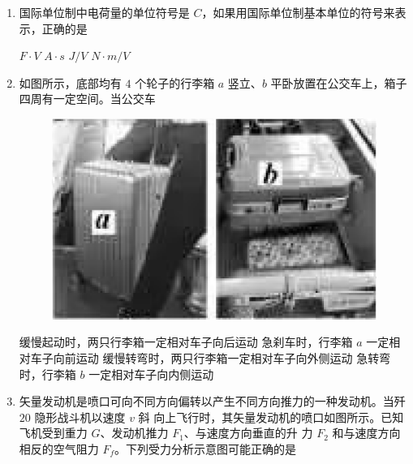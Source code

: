 
\gaokaoxz

\begin{enumerate}
\item
国际单位制中电荷量的单位符号是 $ C $，如果用国际单位制基本单位的符号来表示，正确的是  

\fourchoices
{$ F \cdot V $}
{$ A \cdot s $}
{$ J/V $}
{$ N \cdot m/V $}


\item
如图所示，底部均有 $ 4 $ 个轮子的行李箱 $ a $ 竖立、$ b $ 平卧放置在公交车上，箱子四周有一定空间。当公交车  
\begin{figure}[h!]
\centering
\includegraphics[width=0.23\linewidth]{picture/screenshot041}
\end{figure}

\fourchoices
{缓慢起动时，两只行李箱一定相对车子向后运动}
{急刹车时，行李箱 $ a $ 一定相对车子向前运动}
{缓慢转弯时，两只行李箱一定相对车子向外侧运动}
{急转弯时，行李箱 $ b $ 一定相对车子向内侧运动}


\item
矢量发动机是喷口可向不同方向偏转以产生不同方向推力的一种发动机。当歼 $ 20 $ 隐形战斗机以速度 $ v $ 斜
向上飞行时，其矢量发动机的喷口如图所示。已知飞机受到重力 $ G $、发动机推力 $ F_{1} $、与速度方向垂直的升
力 $ F_{2} $ 和与速度方向相反的空气阻力 $ F_{f} $。下列受力分析示意图可能正确的是  
\begin{figure}[h!]
\centering
  
\end{figure}

\pfourchoices
{}
{}
{}
{}




\end{enumerate}
